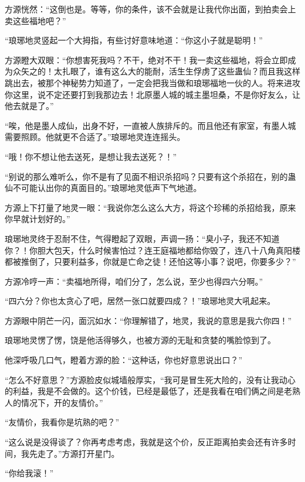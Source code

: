 \begin{this_body}
方源恍然：“这倒也是。等等，你的条件，该不会就是让我代你出面，到拍卖会上卖这些福地吧？”

“琅琊地灵竖起一个大拇指，有些讨好意味地道：“你这小子就是聪明！”

方源瞪大双眼：“你想害死我吗？不干，绝对不干！我一卖这些福地，将会立即成为众矢之的！太扎眼了，谁有这么大的能耐，活生生俘虏了这些蛊仙？而且我这样跳出去，被那个神秘势力知道了，一定会把我当做和琅琊福地一伙的人。将来进攻你这里，说不定还要打到我那边去！北原墨人城的城主墨坦桑，不是你好友么，让他去就是了。”

“唉，他是墨人成仙，出身不好，一直被人族排斥的。而且他还有家室，有墨人城需要照顾。他就更不合适了。”琅琊地灵连连摇头。

“哦！你不想让他去送死，是想让我去送死？！”

“别说的那么难听么，你不是有了见面不相识杀招吗？只要有这个杀招在，别的蛊仙不可能认出你的真面目的。”琅琊地灵低声下气地道。

方源上下打量了地灵一眼：“我说你怎么这么大方，将这个珍稀的杀招给我，原来你早就计划好的。”

琅琊地灵终于忍耐不住，气得瞪起了双眼，声调一扬：“臭小子，我还不知道你？！你胆大包天，什么时候害怕过？连王庭福地都给你毁了，连八十八角真阳楼都被推倒了，只要利益多，你就是亡命之徒！还怕这等小事？说吧，你要多少？”

方源冷哼一声：“卖福地所得，咱们分了，怎么说，至少也得四六分啊。”

“四六分？你也太贪心了吧，居然一张口就要四成？！”琅琊地灵大吼起来。

方源眼中阴芒一闪，面沉如水：“你理解错了，地灵，我说的意思是我六你四！”

琅琊地灵愣了愣，饶是他活得够久，也被方源的无耻和贪婪的嘴脸惊到了。

他深呼吸几口气，瞪着方源的脸：“这种话，你也好意思说出口？”

“怎么不好意思？”方源脸皮似城墙般厚实，“我可是冒生死大险的，没有让我动心的利益，我是不会做的。这个价钱，已经是最低了，还是我看在咱们俩之间是老熟人的情况下，开的友情价。”

“友情价，我看你是坑熟的吧？”

“这么说是没得谈了？你再考虑考虑，我就是这个价，反正距离拍卖会还有许多时间，我先走了。”方源打开星门。

“你给我滚！”

\end{this_body}

